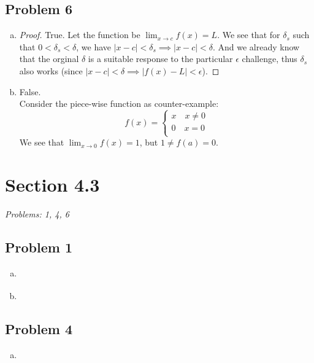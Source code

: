 \documentclass[12pt]{article}
\begin{document}
\subsection*{Problem 6}
\begin{enumerate}[a).]
    \item {
        \begin{proof}
            True. Let the function be $\lim_{x \rightarrow c} f(x) = L$. 
            We see that for $\delta_s$ such that $0 < \delta_s < \delta$, we have $|x - c| < \delta_s \implies |x -c| < \delta$.
            And we already know that the orginal $\delta$ is a suitable response to the particular $\epsilon$ challenge, thus $\delta_s$ also works (since $|x - c| < \delta \implies |f(x) - L| < \epsilon$). 
        \end{proof}
    }
    \item {
        False.\\
        Consider the piece-wise function as counter-example:
        $$ 
        f(x) = \left\{ 
            \begin{array}{ll} 
                x \quad   x \ne 0\\
                0 \quad   x = 0\\
            \end{array} \right.
        $$
        We see that $\lim_{x \rightarrow 0} f(x) = 1$, but $1 \ne f(a) = 0$. 
    }
\end{enumerate}


\section*{Section 4.3}
\textit{Problems: 1, 4, 6}
\subsection*{Problem 1}
\begin{enumerate}[a).]
    \item {
    }
    \item {
    }
\end{enumerate}

\subsection*{Problem 4}
\begin{enumerate}[a).]
    \item {
    }
\end{enumerate}
\end{document}
